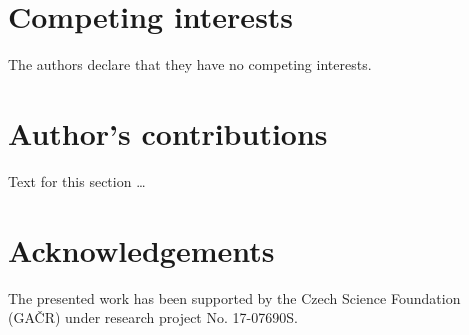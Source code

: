 \documentclass{bmcart}
\begin{document}
\begin{backmatter}

\section*{Competing interests}
  The authors declare that they have no competing interests.

\section*{Author's contributions}
    Text for this section \ldots

\section*{Acknowledgements}
The presented work has been supported by the Czech Science Foundation (GA{\v C}R) under research project No. 17-07690S.






\end{backmatter}
\end{document}
